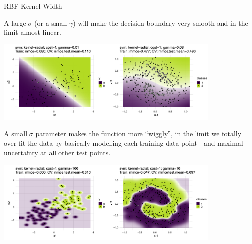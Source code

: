 \begin{vbframe}{RBF Kernel Width}

A large $\sigma$ (or a small $\gamma$) will make the decision boundary very smooth and in the limit almost linear. 

\begin{center}
\includegraphics[width = 11cm ]{figure_man/kernel_width1.png}
\end{center}

\framebreak

A small $\sigma$ parameter makes the function more \enquote{wiggly}, in the limit we totally over fit the data by basically modelling each training data point - and maximal uncertainty at all other test points.

\begin{center}
\includegraphics[width = 11cm ]{figure_man/kernel_width2.png}
\end{center}

\end{vbframe}
\endlecture

